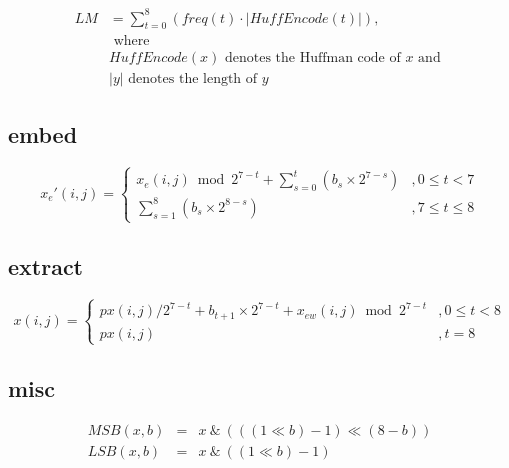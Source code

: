 \begin{equation}
	\begin{aligned}
		LM & = \sum_{t=0}^{8} (freq(t) \cdot \lvert HuffEncode(t) \rvert) , \\
		& \text{ where } \\
		& HuffEncode(x) \text{ denotes the Huffman code of } x \text{ and } \\ 
		& \lvert y \rvert \text{ denotes the length of } y
	\end{aligned}
\end{equation}





\subsection{embed}
\begin{equation}
	{x_e}\prime(i, j) = \left\{
	\begin{array}{rl}
		x_e(i, j) \bmod {2^{7-t}} + \sum_{s=0}^t(b_s \times 2^{7-s}) & , 0 \leq t < 7    \\
		\sum_{s=1}^8(b_s \times 2^{8-s})                            & , 7 \leq t \leq 8
	\end{array}
	\right.
\end{equation}



\subsection{extract}

\begin{equation}
	x(i, j) = \left\{
	\begin{array}{ll}
		px(i, j) / {2^{7-t}} + b_{t+1} \times 2^{7-t} + x_{ew}(i, j) \bmod {2^{7-t}} & , 0 \leq t < 8    \\
		px(i, j)                            & ,  t = 8
	\end{array}
	\right.
\end{equation}




\subsection{misc}

\begin{equation}
	\begin{array}{rcl}
		MSB(x, b) & = & x ~\&~  (((1 \ll b) - 1) \ll (8 - b))  \\
		LSB(x, b) & = & x ~\&~  ((1 \ll b) - 1)
	\end{array}
\end{equation}

